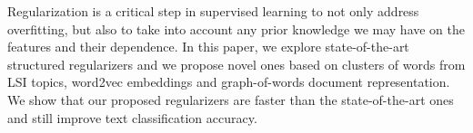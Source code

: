 Regularization is a critical step in supervised learning to not only address overfitting, but also to take into account any prior knowledge we may have on the features and their dependence. In this paper, we explore state-of-the-art structured regularizers and we propose novel ones based on clusters of words from LSI topics, word2vec embeddings and graph-of-words document representation. We show that our proposed regularizers are faster than the state-of-the-art ones and still improve text classification accuracy.
